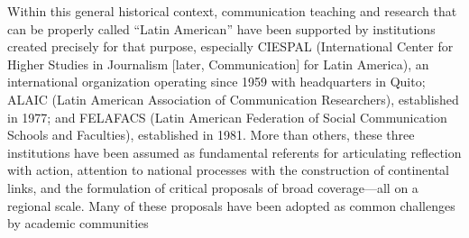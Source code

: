 \documentclass{tufte-handout}
\begin{document}
Within this general historical context, communication teaching and
research that can be properly called ``Latin American'' have been
supported by institutions created precisely for that purpose, especially
CIESPAL (International Center for Higher Studies in Journalism {[}later,
Communication{]} for Latin America), an international organization
operating since 1959 with headquarters in Quito; ALAIC (Latin American
Association of Communication Researchers), established in 1977; and
FELAFACS (Latin American Federation of Social Communication Schools and
Faculties), established in 1981. More than others, these three
institutions have been assumed as fundamental referents for articulating
reflection with action, attention to national processes with the
construction of continental links, and the formulation of critical
proposals of broad coverage---all on a regional scale. Many of these
proposals have been adopted as common challenges by academic communities
\end{document}
